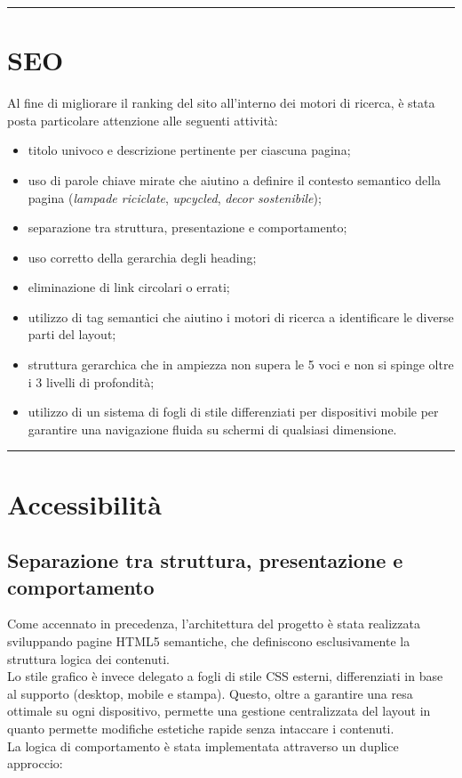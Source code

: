 \documentclass[11pt,a4paper]{article}
\newcommand{\sectionrule}{\vspace{0.5em}\noindent\rule{\linewidth}{0.4pt}\vspace{0.5em}}
\begin{document}
\sectionrule

\section{SEO}

Al fine di migliorare il ranking del sito all'interno dei motori di ricerca, \`e stata posta particolare attenzione alle seguenti attivit\`a:
\begin{itemize}
  \item titolo univoco e descrizione pertinente per ciascuna pagina;
  \item uso di parole chiave mirate che aiutino a definire il contesto semantico della pagina (\textit{lampade riciclate}, \textit{upcycled}, \textit{decor sostenibile});
  \item separazione tra struttura, presentazione e comportamento;
  \item uso corretto della gerarchia degli heading;
  \item eliminazione di link circolari o errati;
  \item utilizzo di tag semantici che aiutino i motori di ricerca a identificare le diverse parti del layout;
  \item struttura gerarchica che in ampiezza non supera le 5 voci e non si spinge oltre i 3 livelli di profondit\`a;
  \item utilizzo di un sistema di fogli di stile differenziati per dispositivi mobile per garantire una navigazione fluida su schermi di qualsiasi dimensione.
\end{itemize}

\sectionrule

\section{Accessibilit\`a}

\subsection{Separazione tra struttura, presentazione e comportamento}
Come accennato in precedenza, l'architettura del progetto \`e stata realizzata sviluppando pagine HTML5 semantiche, che definiscono esclusivamente la struttura logica dei contenuti.\\
Lo stile grafico \`e invece delegato a fogli di stile CSS esterni, differenziati in base al supporto (desktop, mobile e stampa). Questo, oltre a garantire una resa ottimale su ogni dispositivo, permette una gestione centralizzata del layout in quanto permette modifiche estetiche rapide senza intaccare i contenuti.\\
La logica di comportamento \`e stata implementata attraverso un duplice approccio:
\end{document}

